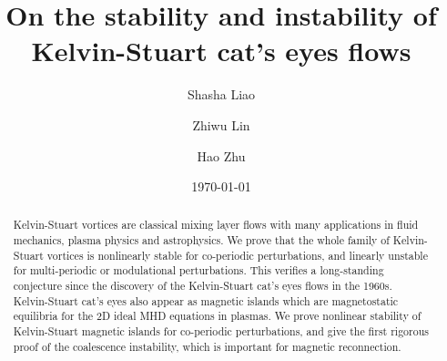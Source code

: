 \documentclass[1 [leqno, 11pt]{amsart}
\numberwithin{equation}{section}
\begin{document}
\begin{CJK*}{GBK}{song}
\title[Stability and instability of Kelvin-Stuart cat's eyes flows]{\textbf {On the  stability and instability of Kelvin-Stuart cat's eyes flows}}


\author{Shasha Liao}
\address{Department of Mathematics, Georgia Institute of Technology, Atlanta, USA}

\author{Zhiwu Lin}
\address{Department of Mathematics, Georgia Institute of Technology, Atlanta, USA}

\author{Hao Zhu}
\address{Department of Mathematics, Nanjing University,  210093, Nanjing, Jiangsu, P. R. China}





\date{\today}

\maketitle

\begin{abstract}
Kelvin-Stuart vortices are classical mixing layer flows with many applications in fluid mechanics,  plasma physics and  astrophysics. We prove that the whole family of Kelvin-Stuart  vortices is nonlinearly stable
for co-periodic perturbations, and linearly unstable for multi-periodic or modulational perturbations.
This verifies a long-standing conjecture  since the discovery  of the Kelvin-Stuart  cat's eyes flows in the 1960s.
Kelvin-Stuart cat's eyes also appear as magnetic islands which are magnetostatic equilibria for the 2D ideal MHD equations in plasmas.
We prove  nonlinear  stability of  Kelvin-Stuart magnetic islands for co-periodic perturbations, and give the first rigorous proof of the coalescence instability,
which is important for magnetic reconnection.
\end{abstract}
\tableofcontents

\end{CJK*}
\end{document}
